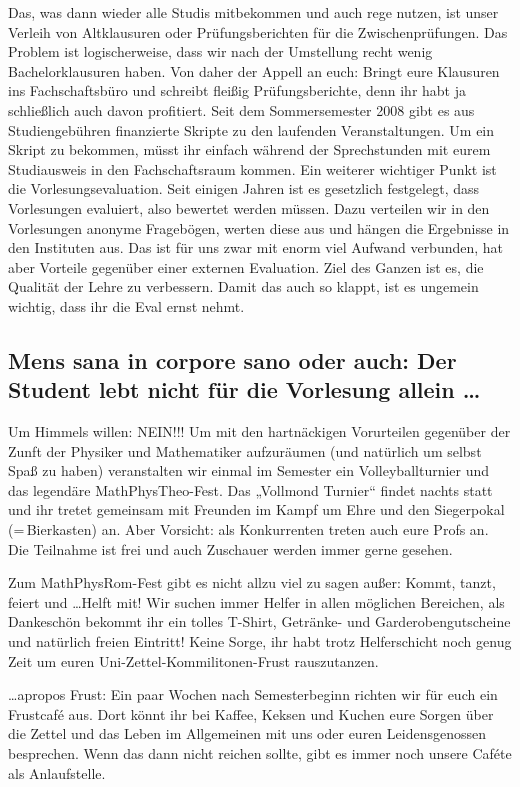 Das, was dann wieder alle Studis mitbekommen und auch rege nutzen, ist unser Verleih von Altklausuren oder Prüfungsberichten für die Zwischenprüfungen. Das Problem ist logischerweise, dass wir nach der Umstellung recht wenig Bachelorklausuren haben. Von daher der Appell an euch: Bringt eure Klausuren ins Fachschaftsbüro und schreibt fleißig Prüfungsberichte, denn ihr habt ja schließlich auch davon profitiert.
Seit dem Sommersemester 2008 gibt es aus Studiengebühren finanzierte Skripte zu den laufenden Veranstaltungen. Um ein Skript zu bekommen, müsst ihr einfach während der Sprechstunden mit eurem Studiausweis in den Fachschaftsraum kommen.
Ein weiterer wichtiger Punkt ist die Vorlesungsevaluation. Seit einigen Jahren ist es gesetzlich festgelegt, dass Vorlesungen evaluiert, also bewertet werden müssen. Dazu verteilen wir in den Vorlesungen anonyme Fragebögen, werten diese aus und hängen die Ergebnisse in den Instituten aus. Das ist für uns zwar mit enorm viel Aufwand verbunden, hat aber  Vorteile gegenüber einer externen Evaluation. Ziel des Ganzen ist es, die Qualität der Lehre zu verbessern. Damit das auch so klappt, ist es ungemein wichtig, dass ihr die Eval ernst nehmt.

\subsection*{Mens sana in corpore sano oder auch: Der Student lebt nicht für die Vorlesung allein \dots}
Um Himmels willen: NEIN!!! Um mit den hartnäckigen Vorurteilen gegenüber der Zunft der Physiker und Mathematiker aufzuräumen (und natürlich um selbst Spaß zu haben) veranstalten wir einmal im Semester ein Volleyballturnier  und das legendäre MathPhysTheo-Fest. Das „Vollmond Turnier“ findet nachts statt und ihr tretet gemeinsam mit Freunden im Kampf um Ehre und den Siegerpokal (=\,Bierkasten) an. Aber Vorsicht: als Konkurrenten treten auch eure Profs an.
Die Teilnahme ist frei und auch Zuschauer werden immer gerne gesehen.


Zum MathPhysRom-Fest gibt es nicht allzu viel zu sagen außer: Kommt, tanzt, feiert und \dots Helft mit! Wir suchen immer Helfer in allen möglichen Bereichen, als Dankeschön bekommt ihr ein tolles T-Shirt, Getränke- und Garderobengutscheine und natürlich freien Eintritt! Keine Sorge, ihr habt trotz Helferschicht noch genug Zeit um euren Uni-Zettel-Kommilitonen-Frust rauszutanzen.


\dots apropos Frust: Ein paar Wochen nach Semesterbeginn richten wir für euch ein Frustcafé aus. Dort könnt ihr bei Kaffee, Keksen und Kuchen eure Sorgen über die Zettel und das Leben im Allgemeinen mit uns oder euren Leidensgenossen besprechen.
Wenn das dann nicht reichen sollte, gibt es immer noch unsere Caféte als Anlaufstelle.


